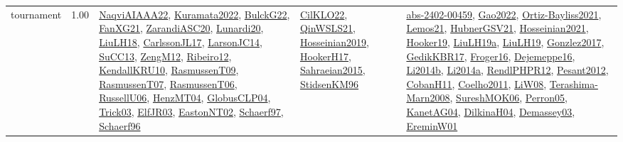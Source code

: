 {\begin{longtable}{p{3cm}r>{\raggedright\arraybackslash}p{6cm}>{\raggedright\arraybackslash}p{6cm}>{\raggedright\arraybackslash}p{8cm}}
\index{tournament}\index{ApplicationAreas!tournament}tournament &  1.00 & \hyperref[detail:NaqviAIAAA22]{NaqviAIAAA22}, \hyperref[detail:Kuramata2022]{Kuramata2022}, \hyperref[detail:BulckG22]{BulckG22}, \hyperref[detail:FanXG21]{FanXG21}, \hyperref[detail:ZarandiASC20]{ZarandiASC20}, \hyperref[detail:Lunardi20]{Lunardi20}, \hyperref[detail:LiuLH18]{LiuLH18}, \hyperref[detail:CarlssonJL17]{CarlssonJL17}, \hyperref[detail:LarsonJC14]{LarsonJC14}, \hyperref[detail:SuCC13]{SuCC13}, \hyperref[detail:ZengM12]{ZengM12}, \hyperref[detail:Ribeiro12]{Ribeiro12}, \hyperref[detail:KendallKRU10]{KendallKRU10}, \hyperref[detail:RasmussenT09]{RasmussenT09}, \hyperref[detail:RasmussenT07]{RasmussenT07}, \hyperref[detail:RasmussenT06]{RasmussenT06}, \hyperref[detail:RussellU06]{RussellU06}, \hyperref[detail:HenzMT04]{HenzMT04}, \hyperref[detail:GlobusCLP04]{GlobusCLP04}, \hyperref[detail:Trick03]{Trick03}, \hyperref[detail:ElfJR03]{ElfJR03}, \hyperref[detail:EastonNT02]{EastonNT02}, \hyperref[detail:Schaerf97]{Schaerf97}, \hyperref[detail:Schaerf96]{Schaerf96} & \hyperref[detail:CilKLO22]{CilKLO22}, \hyperref[detail:QinWSLS21]{QinWSLS21}, \hyperref[detail:Hosseinian2019]{Hosseinian2019}, \hyperref[detail:HookerH17]{HookerH17}, \hyperref[detail:Sahraeian2015]{Sahraeian2015}, \hyperref[detail:StidsenKM96]{StidsenKM96} & \hyperref[detail:abs-2402-00459]{abs-2402-00459}, \hyperref[detail:Gao2022]{Gao2022}, \hyperref[detail:Ortiz-Bayliss2021]{Ortiz-Bayliss2021}, \hyperref[detail:Lemos21]{Lemos21}, \hyperref[detail:HubnerGSV21]{HubnerGSV21}, \hyperref[detail:Hosseinian2021]{Hosseinian2021}, \hyperref[detail:Hooker19]{Hooker19}, \hyperref[detail:LiuLH19a]{LiuLH19a}, \hyperref[detail:LiuLH19]{LiuLH19}, \hyperref[detail:Gonzlez2017]{Gonzlez2017}, \hyperref[detail:GedikKBR17]{GedikKBR17}, \hyperref[detail:Froger16]{Froger16}, \hyperref[detail:Dejemeppe16]{Dejemeppe16}, \hyperref[detail:Li2014b]{Li2014b}, \hyperref[detail:Li2014a]{Li2014a}, \hyperref[detail:RendlPHPR12]{RendlPHPR12}, \hyperref[detail:Pesant2012]{Pesant2012}, \hyperref[detail:CobanH11]{CobanH11}, \hyperref[detail:Coelho2011]{Coelho2011}, \hyperref[detail:LiW08]{LiW08}, \hyperref[detail:Terashima-Marn2008]{Terashima-Marn2008}, \hyperref[detail:SureshMOK06]{SureshMOK06}, \hyperref[detail:Perron05]{Perron05}, \hyperref[detail:KanetAG04]{KanetAG04}, \hyperref[detail:DilkinaH04]{DilkinaH04}, \hyperref[detail:Demassey03]{Demassey03}, \hyperref[detail:EreminW01]{EreminW01}\\

\end{longtable}}
